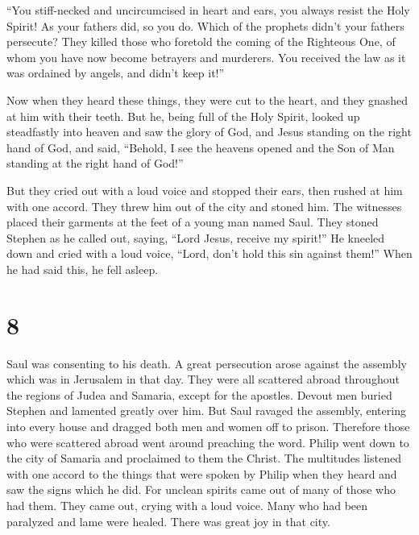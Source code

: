  ``You stiff-necked and uncircumcised in heart and ears,
you always resist the Holy Spirit! As your fathers did, so you do.
 Which of the prophets didn't your fathers persecute?
They killed those who foretold the coming of the Righteous One, of whom
you have now become betrayers and murderers.  You
received the law as it was ordained by angels, and didn't keep it!''

 Now when they heard these things, they were cut to the
heart, and they gnashed at him with their teeth.  But he,
being full of the Holy Spirit, looked up steadfastly into heaven and saw
the glory of God, and Jesus standing on the right hand of God,
 and said, ``Behold, I see the heavens opened and the Son
of Man standing at the right hand of God!''

 But they cried out with a loud voice and stopped their
ears, then rushed at him with one accord.  They threw him
out of the city and stoned him. The witnesses placed their garments at
the feet of a young man named Saul.  They stoned Stephen
as he called out, saying, ``Lord Jesus, receive my spirit!''
 He kneeled down and cried with a loud voice, ``Lord,
don't hold this sin against them!'' When he had said this, he fell
asleep.

\hypertarget{section-7}{%
\section{8}\label{section-7}}

 Saul was consenting to his death. A great persecution
arose against the assembly which was in Jerusalem in that day. They were
all scattered abroad throughout the regions of Judea and Samaria, except
for the apostles.  Devout men buried Stephen and lamented
greatly over him.  But Saul ravaged the assembly, entering
into every house and dragged both men and women off to prison.
 Therefore those who were scattered abroad went around
preaching the word.  Philip went down to the city of
Samaria and proclaimed to them the Christ.  The multitudes
listened with one accord to the things that were spoken by Philip when
they heard and saw the signs which he did.  For unclean
spirits came out of many of those who had them. They came out, crying
with a loud voice. Many who had been paralyzed and lame were healed.
 There was great joy in that city.

